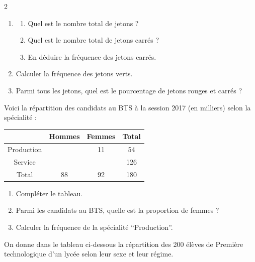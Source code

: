 \documentclass[a4paper,11pt]{article}
\begin{document}
\begin{multicols}{2}
\begin{exercice}[title=Exercice 3 $\star$ { [Calculer] }]{}{}
  \begin{enumerate}[noitemsep]
    \item 
      \begin{enumerate}[noitemsep]
        \item[(a)] Quel est le nombre total de jetons ?
        \item[(b)] Quel est le nombre total de jetons carrés ?
        \item[(c)] En déduire la fréquence des jetons carrés.
      \end{enumerate}
    \item Calculer la fréquence des jetons verts.
    \item Parmi tous les jetons, quel est le pourcentage de jetons rouges et carrés ?
  \end{enumerate}
\end{exercice}


\begin{exercice}[title=Exercice 4 $\star$ { [Calculer] }]{}{}
  Voici la répartition des candidats au BTS à la session 2017 (en milliers) selon la spécialité :
  
  \begin{center}
  \small
  \renewcommand{\arraystretch}{1.2}
  \begin{tabular}{|c|c|c|c|}
  \hline
   & Hommes & Femmes & Total \\ \hline
  Production & & 11 & 54 \\ \hline
  Service & & & 126 \\ \hline
  Total & 88 & 92 & 180 \\ \hline
  \end{tabular}
  \end{center}
  
  \begin{enumerate}[noitemsep]
    \item Compléter le tableau.
    \item Parmi les candidats au BTS, quelle est la proportion de femmes ?
    \item Calculer la fréquence de la spécialité ``Production''.
  \end{enumerate}
\end{exercice}



\begin{exercice}[title=Exercice 5 $\star$ { [Calculer] }]{}{}
  On donne dans le tableau ci-dessous la répartition des 200 élèves de Première technologique d'un lycée selon leur sexe et leur régime.
  

\end{exercice}
\end{multicols}
\end{document}

